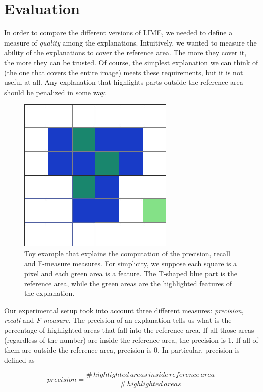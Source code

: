 \documentclass[12pt, twoside, a4paper]{report}
\begin{document}
\section{Evaluation}

In order to compare the different versions of LIME, we needed to define a measure of \textit{quality} among the explanations. Intuitively, we wanted to measure the ability of the explanations to cover the reference area. The more they cover it, the more they can be trusted. Of course, the simplest explanation we can think of (the one that covers the entire image) meets these requirements, but it is not useful at all. Any explanation that highlights parts outside the reference area should be penalized in some way.

\begin{figure}
\begin{center}
\includegraphics[width=.5\textwidth]{images/measures.png} 
\caption{Toy example that explains the computation of the precision, recall and F-measure measures. For simplicity, we suppose each square is a pixel and each green area is a feature. The T-shaped blue part is the reference area, while the green areas are the highlighted features of the explanation.}
\label{fig:measures}
\end{center}
\end{figure}

Our experimental setup took into account three different measures: \textit{precision}, \textit{recall} and \textit{F-measure}. The precision of an explanation tells us what is the percentage of highlighted areas that fall into the reference area. If all those areas (regardless of the number) are inside the reference area, the precision is 1. If all of them are outside the reference area, precision is 0. In particular, precision is defined as 

\begin{equation}
precision =
\frac
     {\#\,highlighted\,areas\,inside\,reference\,area}
     {\#\,highlighted\,areas}      
     \label{eqn:precision}
\end{equation}
\end{document}
